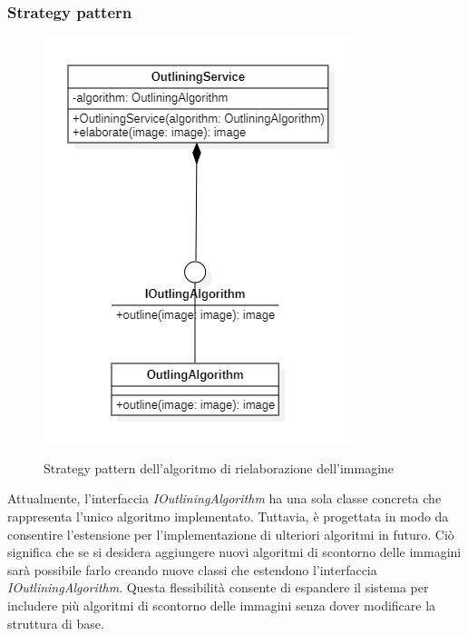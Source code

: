 \subsubsection{Strategy pattern}

\begin{figure}[H]
    \centering
    \includegraphics[scale = 0.8]{img/outlineStrategy.png}\\
    \caption{Strategy pattern dell'algoritmo di rielaborazione dell'immagine}
\end{figure}

Attualmente, l'interfaccia \textit{IOutliningAlgorithm} ha una sola classe concreta che rappresenta l'unico algoritmo implementato. Tuttavia, è progettata in modo da consentire l'estensione per l'implementazione di ulteriori 
algoritmi in futuro. Ciò significa che se si desidera aggiungere nuovi algoritmi di scontorno delle immagini sarà possibile farlo creando nuove classi che estendono l'interfaccia \textit{IOutliningAlgorithm}. 
Questa flessibilità consente di espandere il sistema per includere più algoritmi di scontorno delle immagini senza dover 
modificare la struttura di base.

